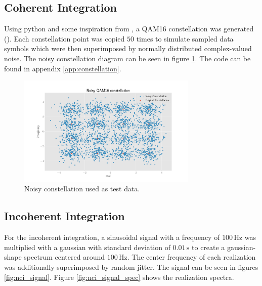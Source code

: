 \subsection{Coherent Integration}

Using python and some inspiration from \cite{python_commpy}, a QAM16 constellation was generated (). Each constellation point was copied $50$ times to simulate sampled data symbols which were then superimposed by normally distributed complex-valued noise. The noisy constellation diagram can be seen in figure \ref{fig:noisy_constellation}. The code can be found in appendix \ref{app:constellation}.

\begin{figure}[h]
  \centering
  \includegraphics[width=0.763\textwidth]{graphics/constellation.pdf}
  \caption{Noisy constellation used as test data.}\label{fig:noisy_constellation}
\end{figure}


\subsection{Incoherent Integration}

For the incoherent integration, a sinusoidal signal with a frequency of $100\,\si{\hertz}$ was multiplied with a gaussian with standard deviation of $0.01\,\si{\second}$ to create a gaussian-shape spectrum centered around $100\,\si{\hertz}$. The center frequency of each realization was additionally superimposed by random jitter. The signal can be seen in figures \ref{fig:nci_signal}. Figure \ref{fig:nci_signal_spec} shows the realization spectra.

